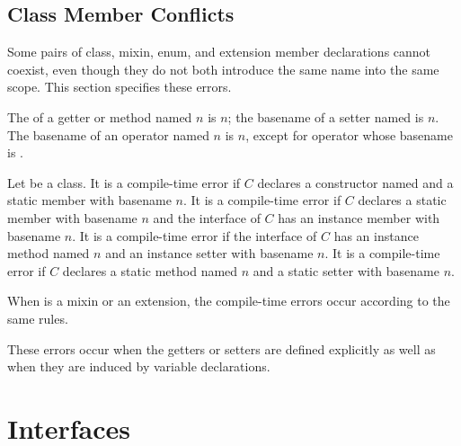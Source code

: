 \documentclass[makeidx]{article}
\begin{document}
\subsection{Class Member Conflicts}

\LMHash{}%
Some pairs of class, mixin, enum, and extension member declarations
cannot coexist,
even though they do not both introduce the same name into the same scope.
This section specifies these errors.

\LMHash{}%
The  of a getter or method named $n$ is $n$;
the basename of a setter named  is $n$.
The basename of an operator named $n$ is $n$,
except for operator \code{[]=} whose basename is \code{[]}.

\LMHash{}%
Let  be a class.
It is a compile-time error if $C$
declares a constructor named  and
a static member with basename $n$.
It is a compile-time error if $C$
declares a static member with basename $n$ and
the interface of $C$ has an instance member with basename $n$.
It is a compile-time error if the interface of $C$
has an instance method named $n$ and an instance setter with basename $n$.
It is a compile-time error if $C$ declares a static method named $n$
and a static setter with basename $n$.

\LMHash{}%
When  is a mixin or an extension,
the compile-time errors occur according to the same rules.

\LMHash{}%
These errors occur when the getters or setters are defined explicitly
as well as when they are induced by variable declarations.



\section{Interfaces}
\end{document}
